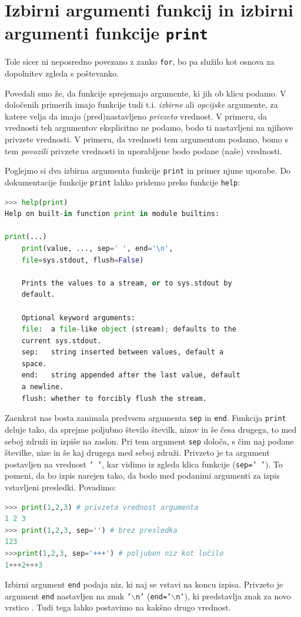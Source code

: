 \section{Izbirni argumenti funkcij in izbirni argumenti funkcije \texttt{print}}

Tole sicer ni neposredno povezano z zanko \texttt{for}, bo pa služilo kot osnova za dopolnitev zgleda s poštevanko. 

Povedali smo že, da funkcije sprejemajo argumente, ki jih ob klicu podamo. V določenih primerih imajo funkcije tudi t.i. \emph{izbirne} ali \emph{opcijske} argumente, za katere velja da imajo (pred)nastavljeno \emph{privzeto} vrednost. V primeru, da vrednosti teh argumentov eksplicitno ne podamo, bodo ti nastavljeni na njihove privzete vrednosti. V primeru, da vrednosti tem argumentom podamo, bomo s tem \emph{povozili} privzete vrednosti in uporabljene bodo podane (naše) vrednosti.

Poglejmo si dva izbirna argumenta funkcije \texttt{print} in primer njune uporabe. Do dokumentacije funkcije \texttt{print} lahko pridemo preko funkcije \texttt{help}:
\begin{lstlisting}[language=Python]
>>> help(print)
Help on built-in function print in module builtins:

print(...)
    print(value, ..., sep=' ', end='\n', 
    file=sys.stdout, flush=False)
    
    Prints the values to a stream, or to sys.stdout by 
    default.
    
    Optional keyword arguments:
    file:  a file-like object (stream); defaults to the 
    current sys.stdout.
    sep:   string inserted between values, default a 
    space.
    end:   string appended after the last value, default 
    a newline.
    flush: whether to forcibly flush the stream.
\end{lstlisting}
Zaenkrat nas bosta zanimala predvsem argumenta \texttt{sep} in \texttt{end}. Funkcija \texttt{print} deluje tako, da sprejme poljubno število številk, nizov in še česa drugega, to med seboj združi in izpiše na zaslon. Pri tem argument \texttt{sep} določa, s čim naj podane številke, nize in še kaj drugega med seboj združi. Privzeto je ta argument postavljen na vrednost \texttt{' '}, kar vidimo iz zgleda klica funkcije (\texttt{sep=' '}). To pomeni, da bo izpis narejen tako, da bodo med podanimi argumenti za izpis vstavljeni presledki. Povadimo:
\begin{lstlisting}[language=Python]
>>> print(1,2,3) # privzeta vrednost argumenta
1 2 3
>>> print(1,2,3, sep='') # brez presledka
123
>>>print(1,2,3, sep='+++') # poljuben niz kot ločilo
1+++2+++3
\end{lstlisting}
Izbirni argument \texttt{end} podaja niz, ki naj se vstavi na koncu izpisa. Privzeto je argument \texttt{end} nastavljen na znak \texttt{'$\backslash$n'} (\texttt{end='$\backslash$n'}), ki predstavlja znak za novo vrstico . Tudi tega lahko postavimo na kakšno drugo vrednost. 

